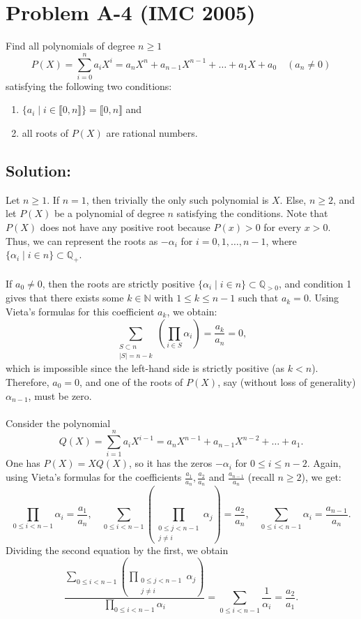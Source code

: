 \documentclass[11pt, a4paper, oneside]{article}
\newcommand{\problem}[1][]{\section{#1} \hfill \par}
\newcommand{\solution}[1][]{\subsection*{#1}\hfill \par}
\theoremstyle{remark}
\theoremstyle{lemma}
\begin{document}
\newpage

\problem[Problem A-4 (IMC 2005)]
Find all polynomials of degree $n\geq 1$
\[
P(X) = \sum_{i=0}^{n}a_iX^i=a_n X^n + a_{n-1} X^{n-1} + \dots + a_1 X + a_0 \quad (a_n \neq 0)
\]
satisfying the following two conditions:

\begin{enumerate}
    \item \( \{a_i\mid i\in\llbracket0,n\rrbracket\}=\llbracket0,n\rrbracket\) and
    \item all roots of \( P(X) \) are rational numbers.
\end{enumerate}

\solution[Solution:] 
Let $n\geq 1$. If $n=1$, then trivially the only such polynomial is $X$. Else, $n\geq 2$, and let $P(X)$ be a polynomial of degree $n$ satisfying the conditions. Note that \( P(X) \) does not have any positive root because \( P(x) > 0 \) for every \( x > 0 \). Thus, we can represent the roots as \( -\alpha_i \) for \( i = 0,1, \dots, n-1 \), where \( \{\alpha_i\mid i\in n\}\subset\mathbb{Q}_{+}\).
\\\\
If \( a_0 \neq 0 \), then the roots are strictly positive $\{\alpha_i\mid i\in n\}\subset\mathbb{Q}_{>0}$, and condition 1 gives that there exists some \( k \in \mathbb{N} \) with \( 1 \leq k \leq n-1 \) such that \( a_k = 0 \). Using Vieta’s formulas for this coefficient $a_k$, we obtain: 
\[
    \sum_{\substack{S\subset n\\|S|=n-k}}\left(\prod_{i\in S}\alpha_i\right)= \frac{a_k}{a_n}=0,
\]
which is impossible since the left-hand side is strictly positive (as $k<n$). Therefore, \( a_0 = 0 \), and one of the roots of \( P(X) \), say (without loss of generality) \( \alpha_{n-1} \), must be zero.
\\\\
Consider the polynomial \[
    Q(X) = \sum_{i=1}^{n}a_iX^{i-1}=a_n X^{n-1} + a_{n-1} X^{n-2} + \dots + a_1.
\]
One has $P(X)=XQ(X)$, so it has the zeros \( -\alpha_i \) for \( 0\leq i\leq n-2\). Again, using Vieta’s formulas for the coefficients $\frac{a_1}{a_n},\frac{a_{2}}{a_n}$ and $\frac{a_{n-1}}{a_n}$ (recall $n\geq 2$), we get:
\[
    \prod_{0\leq i<n-1}\alpha_i = \frac{a_1}{a_n},\quad
    \sum_{0\leq i<n-1}\left(\prod_{\substack{0\leq j<n-1\\j\neq i}}\alpha_j\right)= \frac{a_2}{a_n},
\quad
    \sum_{0\leq i<n-1}\alpha_i= \frac{a_{n-1}}{a_n}.
\]
Dividing the second equation by the first, we obtain
\[
    \frac{\sum_{0\leq i<n-1}\left(\prod_{\substack{0\leq j<n-1\\j\neq i}}\alpha_j\right)}{\prod_{0\leq i<n-1}\alpha_i}=\sum_{0\leq i<n-1}\frac{1}{\alpha_i} = \frac{a_{2}}{a_1}.
\]
\end{document}
